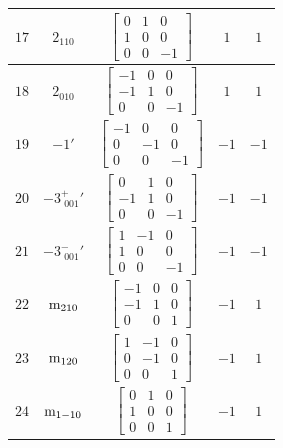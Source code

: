 \documentclass[fleqn,8pt]{jsarticle}
\begin{document}
\begin{longtable}{ccccc}
$ 17 $ & $ 2{}_{110} $ & $ \begin{bmatrix} 0 & 1 & 0 \\ 1 & 0 & 0 \\ 0 & 0 & -1 \end{bmatrix} $ & $ 1 $ & $ 1 $ \\ \hline
$ 18 $ & $ 2{}_{010} $ & $ \begin{bmatrix} -1 & 0 & 0 \\ -1 & 1 & 0 \\ 0 & 0 & -1 \end{bmatrix} $ & $ 1 $ & $ 1 $ \\ \hline
$ 19 $ & $ -1{}' $ & $ \begin{bmatrix} -1 & 0 & 0 \\ 0 & -1 & 0 \\ 0 & 0 & -1 \end{bmatrix} $ & $ -1 $ & $ -1 $ \\ \hline
$ 20 $ & $ -3^{+}_{\,\,001}{}' $ & $ \begin{bmatrix} 0 & 1 & 0 \\ -1 & 1 & 0 \\ 0 & 0 & -1 \end{bmatrix} $ & $ -1 $ & $ -1 $ \\ \hline
$ 21 $ & $ -3^{-}_{\,\,001}{}' $ & $ \begin{bmatrix} 1 & -1 & 0 \\ 1 & 0 & 0 \\ 0 & 0 & -1 \end{bmatrix} $ & $ -1 $ & $ -1 $ \\ \hline
$ 22 $ & $ {\rm m}_{210} $ & $ \begin{bmatrix} -1 & 0 & 0 \\ -1 & 1 & 0 \\ 0 & 0 & 1 \end{bmatrix} $ & $ -1 $ & $ 1 $ \\ \hline
$ 23 $ & $ {\rm m}_{120} $ & $ \begin{bmatrix} 1 & -1 & 0 \\ 0 & -1 & 0 \\ 0 & 0 & 1 \end{bmatrix} $ & $ -1 $ & $ 1 $ \\ \hline
$ 24 $ & $ {\rm m}_{1-10} $ & $ \begin{bmatrix} 0 & 1 & 0 \\ 1 & 0 & 0 \\ 0 & 0 & 1 \end{bmatrix} $ & $ -1 $ & $ 1 $ \\
\end{longtable}
\end{document}
